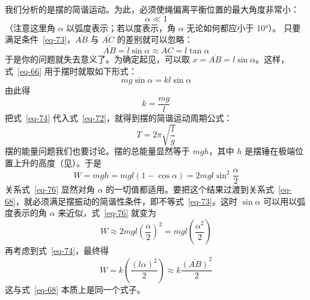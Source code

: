 \begin{dialogue}
\tchr 我们分析的是摆的简谐运动。为此，必须使绳偏离平衡位置的最大角度非常小：
\begin{equation}%
\alpha \ll 1
\label{eq-73}
\end{equation}
（注意这里角 $\alpha$ 以弧度表示；若以度表示，角 $\alpha$ 无论如何都应小于 \ang{10}）。
只要满足条件~\eqref{eq-73}，$\overline{AB}$ 与 $\overline{AC}$ 的差别就可以忽略：
\begin{equation*}%
\overline{AB} = l \sin \alpha \approx \overline{AC} = l \tan \alpha
\end{equation*}
于是你的问题就失去意义了。为确定起见，可以取 $x = \overline{AB}= l \sin \alpha$。这样，式~\eqref{eq-66} 用于摆时就取如下形式：
\begin{equation}%
mg \sin \alpha = k l \sin \alpha
\tag{66a}
\label{eq-66a}
\end{equation}
由此得
\begin{equation}%
k= \frac{mg}{l}
\label{eq-74}
\end{equation}
把式~\eqref{eq-74} 代入式~\eqref{eq-72}，就得到摆的简谐运动周期公式：
\begin{equation}%
T=2 \pi \sqrt{\frac{l}{g}}
\label{eq-75}
\end{equation}
摆的能量问题我们也要讨论。摆的总能量显然等于 $mgh$，其中 $h$ 是摆锤在极端位置上升的高度（见）。于是
\begin{equation}%
W = mgh = mgl \left( 1- \cos \alpha \right) = 2mgl \sin^{2} \frac{\alpha}{2}
\label{eq-76}
\end{equation}
关系式~\eqref{eq-76} 显然对角 $\alpha$ 的一切值都适用。要把这个结果过渡到关系式~\eqref{eq-68}，就必须满足摆振动的简谐性条件，即不等式~\eqref{eq-73}。这时 $\sin \alpha$ 可以用以弧度表示的角 $\alpha$ 来近似，式~\eqref{eq-76} 就变为
\begin{equation*}%
W \approx 2 m g l \left( \frac{\alpha}{2}\right)^{2} = mgl \left( \frac{\alpha^{2}}{2}\right)
\end{equation*}
再考虑到式~\eqref{eq-74}，最终得
\begin{equation*}%
W = k \left( \frac{(l \alpha)^{2}}{2}\right) \approx k \frac{\overline{(AB)}^{2}}{2}
\end{equation*}
这与式~\eqref{eq-68} 本质上是同一个式子。


\end{dialogue}
